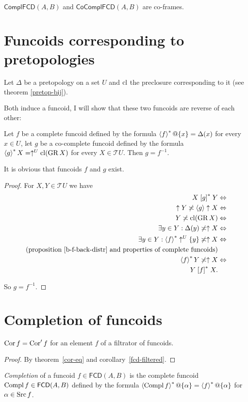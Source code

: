 \begin{cor}
$\mathsf{ComplFCD}(A,B)$ and $\mathsf{CoComplFCD}(A,B)$ are co-frames.
\end{cor}

\section{Funcoids corresponding to pretopologies}

Let $\Delta$ be a pretopology on a set $U$ and $\operatorname{cl}$ the preclosure
corresponding to it (see theorem \ref{pretop-bij}).

Both induce a funcoid, I will show that these two funcoids are reverse
of each other:
\begin{thm}
Let $f$ be a complete funcoid defined by the formula $\left\langle f\right\rangle ^{\ast}@\{x\}=\Delta(x)$
for every $x\in U$, let $g$ be a co-complete funcoid defined by
the formula $\left\langle g\right\rangle ^{\ast}X=\uparrow^{U}\operatorname{cl}(\operatorname{GR} X)$ for every $X\in\mathscr{T}U$.
Then $g=f^{-1}$.\end{thm}
\begin{rem}
It is obvious that funcoids $f$ and $g$ exist.\end{rem}
\begin{proof}
For $X,Y\in\mathscr{T}U$ we have
\begin{align*}
X\mathrel{\left[g\right]^{\ast}}Y & \Leftrightarrow\\
\uparrow Y\not\asymp\left\langle g\right\rangle\uparrow X & \Leftrightarrow\\
Y\not\asymp\operatorname{cl}(\operatorname{GR} X) & \Leftrightarrow\\
\exists y\in Y:\Delta(y)\not\asymp\uparrow X & \Leftrightarrow\\
\exists y\in Y:\left\langle f\right\rangle ^{\ast}\uparrow^{U}\{y\}\not\asymp\uparrow X & \Leftrightarrow\\
\text{(proposition \ref{b-f-back-distr} and properties of complete funcoids)}\\
\left\langle f\right\rangle ^{\ast}Y\not\asymp\uparrow X & \Leftrightarrow\\
Y\mathrel{\left[f\right]^{\ast}}X.
\end{align*}


So $g=f^{-1}$.
\end{proof}

\section{Completion of funcoids}
\begin{thm}
$\operatorname{Cor} f=\operatorname{Cor}'f$ for an element $f$ of a filtrator of funcoids.\end{thm}
\begin{proof}
By theorem~\ref{cor-eq} and corollary~\ref{fcd-filtered}.\end{proof}
\begin{defn}
\emph{Completion} of a funcoid
$f\in\mathsf{FCD}(A,B)$
is the complete funcoid $\operatorname{Compl} f\in\mathsf{FCD}(A,B)$ defined by
the formula $\left\langle \operatorname{Compl} f\right\rangle ^{\ast}@\{\alpha\}=\left\langle f\right\rangle ^{\ast}@\{\alpha\}$
for $\alpha\in\operatorname{Src} f$.
\end{defn}

